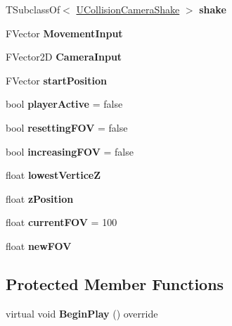 \begin{DoxyCompactItemize}
\item 
\mbox{\label{class_a_temp_player_a67a2b59b09ab7a3aabb9c0cc1d23e617}} 
T\+Subclass\+Of$<$ \mbox{\hyperlink{class_u_collision_camera_shake}{U\+Collision\+Camera\+Shake}} $>$ {\bfseries shake}
\item 
\mbox{\label{class_a_temp_player_abeeef7c722e14fb1d087239ebe7db40d}} 
F\+Vector {\bfseries Movement\+Input}
\item 
\mbox{\label{class_a_temp_player_a0ff43db59c846d471861a2d2b7f72a28}} 
F\+Vector2D {\bfseries Camera\+Input}
\item 
\mbox{\label{class_a_temp_player_ad50276ef867eacf5cbab70386d5ea4b8}} 
F\+Vector {\bfseries start\+Position}
\item 
\mbox{\label{class_a_temp_player_aa61729cbbc9c808e273b8ff7380b05e8}} 
bool {\bfseries player\+Active} = false
\item 
\mbox{\label{class_a_temp_player_ac06dc7ef414b6dfd45b80744ff70771c}} 
bool {\bfseries resetting\+F\+OV} = false
\item 
\mbox{\label{class_a_temp_player_ad447762e085c9f82d230776d74cf44d5}} 
bool {\bfseries increasing\+F\+OV} = false
\item 
\mbox{\label{class_a_temp_player_a27b32530d8edaa9bfa115b47a1ce777e}} 
float {\bfseries lowest\+VerticeZ}
\item 
\mbox{\label{class_a_temp_player_aef5a8139028bd00a0030e99db5fc68e8}} 
float {\bfseries z\+Position}
\item 
\mbox{\label{class_a_temp_player_abab75a2e63573f4b0ed2b02ff0f108d2}} 
float {\bfseries current\+F\+OV} = 100
\item 
\mbox{\label{class_a_temp_player_ae5fddd2dbc2e2fbd1eb4adc60c1074fe}} 
float {\bfseries new\+F\+OV}
\end{DoxyCompactItemize}
\subsection*{Protected Member Functions}
\begin{DoxyCompactItemize}
\item 
\mbox{\label{class_a_temp_player_aceace2056147a31a0c6a90a3665a4971}} 
virtual void {\bfseries Begin\+Play} () override
\end{DoxyCompactItemize}


